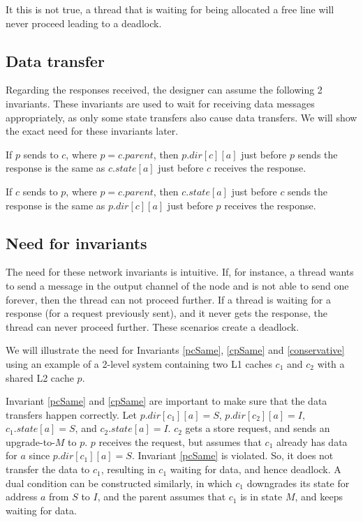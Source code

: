 It this is not true, a thread that is waiting for being allocated a free line
will never proceed leading to a deadlock.

\subsection{Data transfer}
Regarding the responses received, the designer can assume the following 2
invariants. These invariants are used to wait for receiving data messages
appropriately, as only some state transfers also cause data transfers.
We will show the exact need for these invariants later.

\begin{theorem}
If $p$ sends  to $c$, where $p = c.parent$, then $p.dir[c][a]$
just before $p$ sends the response is the same as $c.state[a]$ just before $c$
receives the response.
\label{pcSame}
\end{theorem}

\begin{theorem}
If $c$ sends  to $p$, where $p = c.parent$, then $c.state[a]$
just before $c$ sends the response is the same as $p.dir[c][a]$ just before $p$
receives the response.
\label{cpSame}
\end{theorem}

\subsection{Need for invariants}
The need for these network invariants is intuitive. If, for instance, a thread wants to
send a message in the output channel of the node and is not able to send one
forever, then the thread can not proceed further. If a thread is waiting for a
response (for a request previously sent), and it never gets the response, the
thread can never proceed further. These scenarios create a deadlock.

We will illustrate the need for Invariants \ref{pcSame}, \ref{cpSame} and
\ref{conservative} using an example of a 2-level system containing two L1
caches $c_1$ and $c_2$ with a shared L2 cache $p$.

Invariant \ref{pcSame} and \ref{cpSame} are important to make sure that the
data transfers happen correctly. Let $p.dir[c_1][a] = S$, $p.dir[c_2][a] = I$,
$c_1.state[a] = S$, and $c_2.state[a] = I$. $c_2$ gets a store request, and
sends an upgrade-to-$M$ to $p$. $p$ receives the request, but assumes that
$c_1$ already has data for $a$ since $p.dir[c_1][a] = S$. Invariant
\ref{pcSame} is violated. So, it does not transfer the data to $c_1$, resulting
in $c_1$ waiting for data, and hence deadlock. A dual condition can be
constructed similarly, in which $c_1$ downgrades its state for address $a$ from
$S$ to $I$, and the parent assumes that $c_1$ is in state $M$, and keeps
waiting for data.

